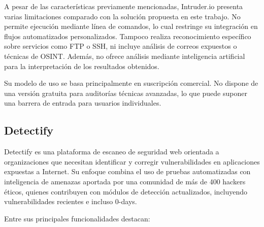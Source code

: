 \begin{parskipenv}
A pesar de las características previamente mencionadas, Intruder.io presenta varias limitaciones comparado con la solución propuesta en este trabajo. No permite ejecución mediante línea de comandos, lo cual restringe su integración en flujos automatizados personalizados. Tampoco realiza reconocimiento específico sobre servicios como FTP o SSH, ni incluye análisis de correos expuestos o técnicas de OSINT. Además, no ofrece análisis mediante inteligencia artificial para la interpretación de los resultados obtenidos.

Su modelo de uso se basa principalmente en suscripción comercial. No dispone de una versión gratuita para auditorías técnicas avanzadas, lo que puede suponer una barrera de entrada para usuarios individuales.

\subsection{Detectify}

Detectify es una plataforma de escaneo de seguridad web orientada a organizaciones que necesitan identificar y corregir vulnerabilidades en aplicaciones expuestas a Internet. Su enfoque combina el uso de pruebas automatizadas con inteligencia de amenazas aportada por una comunidad de más de 400 hackers éticos, quienes contribuyen con módulos de detección actualizados, incluyendo vulnerabilidades recientes e incluso 0-days.

Entre sus principales funcionalidades destacan:


\end{parskipenv}
